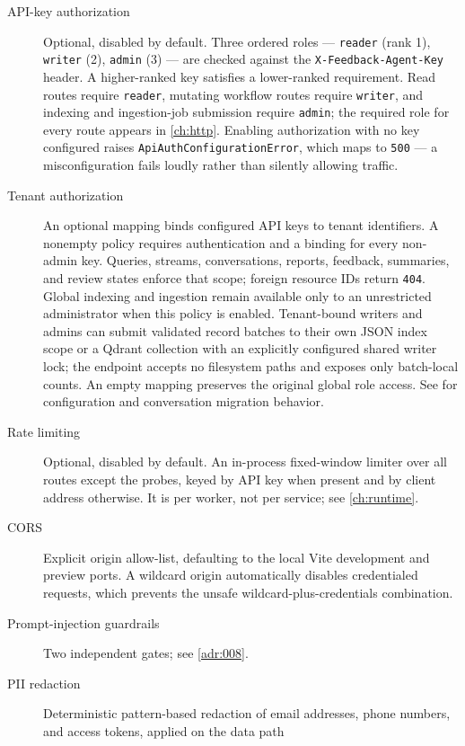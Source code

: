 \begin{description}
  \item[API-key authorization] Optional, disabled by default. Three ordered
    roles --- \texttt{reader} (rank 1), \texttt{writer} (2), \texttt{admin}
    (3) --- are checked against the \texttt{X-Feedback-Agent-Key} header. A
    higher-ranked key satisfies a lower-ranked requirement. Read routes require
    \texttt{reader}, mutating workflow routes require \texttt{writer}, and
    indexing and ingestion-job submission require \texttt{admin}; the required
    role for every route appears in \cref{ch:http}. Enabling authorization with
    no key configured raises \texttt{ApiAuthConfigurationError}, which maps to
    \texttt{500} --- a misconfiguration fails loudly rather than silently
    allowing traffic.
  \item[Tenant authorization] An optional mapping binds configured API keys to
    tenant identifiers. A nonempty policy requires authentication and a binding
    for every non-admin key. Queries, streams, conversations, reports, feedback,
    summaries, and review states enforce that scope; foreign resource IDs return
    \texttt{404}. Global indexing and ingestion remain available only to an
    unrestricted administrator when this policy is enabled. Tenant-bound writers
    and admins can submit validated record batches to their own JSON index scope
    or a Qdrant collection with an explicitly configured shared writer lock;
    the endpoint accepts no filesystem paths and exposes only batch-local counts.
    An empty mapping
    preserves the original global role access. See  for
    configuration and conversation migration behavior.
  \item[Rate limiting] Optional, disabled by default. An in-process
    fixed-window limiter over all routes except the probes, keyed by API key
    when present and by client address otherwise. It is per worker, not per
    service; see \cref{ch:runtime}.
  \item[CORS] Explicit origin allow-list, defaulting to the local Vite
    development and preview ports. A wildcard origin automatically disables
    credentialed requests, which prevents the unsafe wildcard-plus-credentials
    combination.
  \item[Prompt-injection guardrails] Two independent gates; see
    \cref{adr:008}.
  \item[PII redaction] Deterministic pattern-based redaction of email
    addresses, phone numbers, and access tokens, applied on the data path

\end{description}
